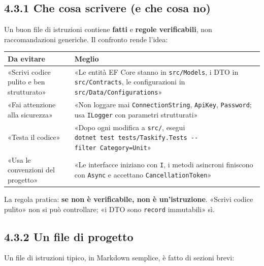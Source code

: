 \documentclass[
  italian,
  10pt,
]{book}
\newcounter{none} %
\begin{document}
\subsection{4.3.1 Che cosa scrivere (e che cosa
no)}\label{che-cosa-scrivere-e-che-cosa-no}

Un buon file di istruzioni contiene \textbf{fatti} e \textbf{regole
verificabili}, non raccomandazioni generiche. Il confronto rende l'idea:

{\def\LTcaptype{none} %
\begin{longtable}[]{@{}
  >{\raggedright\arraybackslash}p{}
  >{\raggedright\arraybackslash}p{}@{}}
\toprule\noalign{}
\begin{minipage}[b]{\linewidth}\raggedright
Da evitare
\end{minipage} & \begin{minipage}[b]{\linewidth}\raggedright
Meglio
\end{minipage} \\
\midrule\noalign{}
\endhead
\bottomrule\noalign{}
\endlastfoot
«Scrivi codice pulito e ben strutturato» & «Le entità EF Core stanno in
\texttt{src/Models}, i DTO in \texttt{src/Contracts}, le configurazioni
in \texttt{src/Data/Configurations}» \\
«Fai attenzione alla sicurezza» & «Non loggare mai
\texttt{ConnectionString}, \texttt{ApiKey}, \texttt{Password}; usa
\texttt{ILogger} con parametri strutturati» \\
«Testa il codice» & «Dopo ogni modifica a \texttt{src/}, esegui
\texttt{dotnet\ test\ tests/Taskify.Tests\ -\/-filter\ Category=Unit}» \\
«Usa le convenzioni del progetto» & «Le interfacce iniziano con
\texttt{I}, i metodi asincroni finiscono con \texttt{Async} e accettano
\texttt{CancellationToken}» \\
\end{longtable}
}

La regola pratica: \textbf{se non è verificabile, non è un'istruzione}.
«Scrivi codice pulito» non si può controllare; «i DTO sono
\texttt{record} immutabili» sì.

\subsection{4.3.2 Un file di progetto}\label{un-file-di-progetto}

Un file di istruzioni tipico, in Markdown semplice, è fatto di sezioni
brevi:
\end{document}
